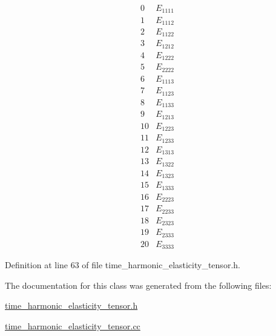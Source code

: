 \[\begin{array}{cc} 0 & E_{1111} \\ 1 & E_{1112} \\ 2 & E_{1122} \\ 3 & E_{1212} \\ 4 & E_{1222} \\ 5 & E_{2222} \\ 6 & E_{1113} \\ 7 & E_{1123} \\ 8 & E_{1133} \\ 9 & E_{1213} \\ 10 & E_{1223} \\ 11 & E_{1233} \\ 12 & E_{1313} \\ 13 & E_{1322} \\ 14 & E_{1323} \\ 15 & E_{1333} \\ 16 & E_{2223} \\ 17 & E_{2233} \\ 18 & E_{2323} \\ 19 & E_{2333} \\ 20 & E_{3333} \end{array}\] 

Definition at line 63 of file time\+\_\+harmonic\+\_\+elasticity\+\_\+tensor.\+h.



The documentation for this class was generated from the following files\+:\begin{DoxyCompactItemize}
\item 
\hyperlink{time__harmonic__elasticity__tensor_8h}{time\+\_\+harmonic\+\_\+elasticity\+\_\+tensor.\+h}\item 
\hyperlink{time__harmonic__elasticity__tensor_8cc}{time\+\_\+harmonic\+\_\+elasticity\+\_\+tensor.\+cc}\end{DoxyCompactItemize}
